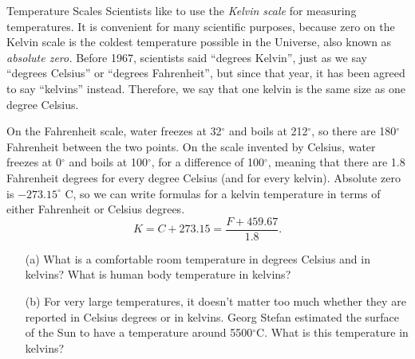 \documentclass[12pt]{article}
\begin{document}
\begin{probdesc}{3}{Temperature Scales}
Scientists like to use the {\em Kelvin scale} for measuring
temperatures.  It is convenient for many scientific purposes, because
zero on the Kelvin scale is the coldest temperature possible in the
Universe, also known as {\em absolute zero.}  Before 1967, scientists
said ``degrees Kelvin'', just as we say ``degrees Celsius'' or
``degrees Fahrenheit'', but since that year, it has been agreed to say
``kelvins'' instead.  Therefore, we say that one kelvin is the same
size as one degree Celsius.

On the Fahrenheit scale, water freezes at 32$^\circ$ and boils at
212$^\circ$, so there are 180$^\circ$ Fahrenheit between the
two points.  On the scale invented by Celsius, water freezes at
0$^\circ$ and boils at 100$^\circ$, for a difference of
100$^\circ$, meaning that there are 1.8 Fahrenheit degrees for every
degree Celsius (and for every kelvin).  Absolute zero is
$-273.15^\circ$ C, so we can write formulas for a kelvin temperature
in terms of either Fahrenheit or Celsius degrees.
\begin{equation}
K = C + 273.15 = \frac{F + 459.67}{1.8}.
\end{equation}

\begin{enumerate}
\item[(a)] What is a comfortable room temperature in degrees Celsius
  and in kelvins?  What is human body temperature in kelvins?

\item[(b)] For very large temperatures, it doesn't matter too much
  whether they are reported in Celsius degrees or in kelvins.  Georg
  Stefan estimated the surface of the Sun to have a temperature around
  5500$^\circ$C.  What is this temperature in kelvins? 
\end{enumerate}

\end{probdesc}
\end{document}
